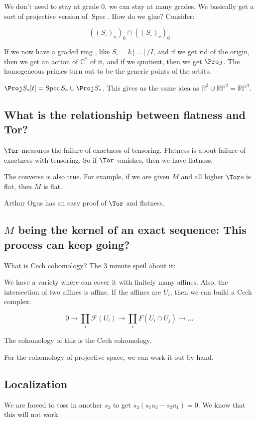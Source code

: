 \documentclass{book}
\newcommand{\F}{\ensuremath{\mathcal{F}}}
\newcommand{\C}{\ensuremath{\mathbb{C}}}
\newcommand{\R}{\ensuremath{\mathbb{R}}}
\renewcommand{\P}{\ensuremath{\mathbb{P}}}
\newcommand{\Spec}{\operatorname{Spec}}
\theoremstyle{definition}
\begin{document}
We don't need to stay at grade $0$, we can stay at many grades. We basically
get a sort of projective version of $\Spec$. How do we glue? Consider:

$$
((S_\circ)_u)_0 \cap ((S_\circ)_v)_0
$$

If we now have a graded ring , like $S_\circ = k[\dots]/I$, and if we
get rid of the origin, then we get an action of $\C^*$ of it, and if we
quotient, then we get $\Proj$. The homogeneous primes turn out to be the
generic points of the orbits.

$\Proj S_\circ[t] = \Spec S_\circ \cup \Proj S_\circ$. This gives
us the same idea as $\R^3 \cup \R \P^2 = \R \P^3$.

\subsection{What is the relationship between flatness and Tor?}
$\Tor$ measures the failure of exactness of tensoring. Flatness is about
failure of exactness with tensoring. So if $\Tor$ vanishes, then we have
flatness.

The converse is also true. For example, if we are given $M$ and all
higher $\Tor$s is flat, then $M$ is flat.

Arthur Ogus has an easy proof of $\Tor$ and flatness.

\subsection{$M$ being the kernel of an exact sequence: This process can keep going?}
What is Cech cohomology? The 3 minute speil about it:

We have a variety where can cover it with finitely many affines. Also, the
intersection of two affines is affine. If the affines are $U_i$, then 
we can build a Cech complex:

$$
0 \rightarrow \prod_i \F(U_i) \rightarrow \prod_i F(U_i \cap U_j) \rightarrow \dots
$$

The cohomology of this is the Cech cohomology. 

For the cohomology of projective space, we can work it out by hand.

\subsection{Localization}

We are forced to toss in another $s_3$ to get $s_3(s_1 a_2 - s_2 a_1) = 0$.
We know that this will not work.
\end{document}
